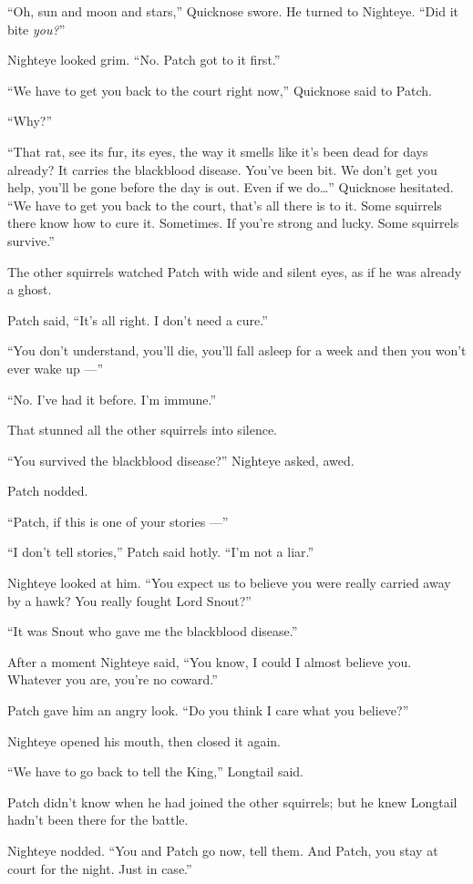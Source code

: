 \documentclass[ebook,oneside,openany,17pt]{memoir}
\begin{document}
“Oh, sun and moon and stars,” Quicknose swore. He turned to
Nighteye. “Did it bite \emph{you?}”

Nighteye looked grim. “No. Patch got to it first.”

“We have to get you back to the court right now,” Quicknose said to
Patch.

“Why?”

“That rat, see its fur, its eyes, the way it smells like it’s been
dead for days already? It carries the blackblood disease. You’ve been
bit. We don’t get you help, you’ll be gone before the day is out. Even
if we do…” Quicknose hesitated. “We have to get you back to the court,
that’s all there is to it. Some squirrels there know how to cure
it. Sometimes. If you’re strong and lucky. Some squirrels survive.”

The other squirrels watched Patch with wide and silent eyes, as if he
was already a ghost.

Patch said, “It’s all right. I don’t need a cure.”

“You don’t understand, you’ll die, you’ll fall asleep for a week and
then you won’t ever wake up —”

“No. I’ve had it before. I’m immune.”

That stunned all the other squirrels into silence.

“You survived the blackblood disease?” Nighteye asked, awed.

Patch nodded.

“Patch, if this is one of your stories —”

“I don’t tell stories,” Patch said hotly. “I’m not a liar.”

Nighteye looked at him. “You expect us to believe you were really
carried away by a hawk? You really fought Lord Snout?”

“It was Snout who gave me the blackblood disease.”

After a moment Nighteye said, “You know, I could I almost believe
you. Whatever you are, you’re no coward.”

Patch gave him an angry look. “Do you think I care what you believe?”

Nighteye opened his mouth, then closed it again.

“We have to go back to tell the King,” Longtail said.

Patch didn’t know when he had joined the other squirrels; but he knew
Longtail hadn’t been there for the battle.

Nighteye nodded. “You and Patch go now, tell them. And Patch, you stay
at court for the night. Just in case.”
\end{document}
